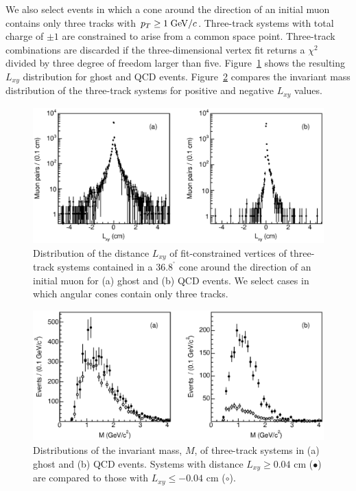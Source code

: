 \documentclass[aps,prd,preprint,floatfix,nofootinbib,superscriptaddress,showpacs,amssymb]{revtex4}
\def\deg{^\circ}
\begin{document}
 We also select events in which a cone around the direction of an initial
 muon contains only three tracks with $p_T \geq 1 \; {\rm GeV/}c$. Three-track
 systems with total charge of $\pm 1$ are constrained to arise from a
 common space point. Three-track combinations are discarded if the
 three-dimensional vertex fit returns a $\chi^2$ divided by three degree
 of freedom larger than five. Figure~\ref{fig:fig_37} shows the resulting $L_{xy}$
 distribution for ghost and QCD events. Figure~\ref{fig:fig_38} compares
 the invariant mass distribution  of the three-track systems for positive and negative
 $L_{xy}$ values.
 \begin{figure}
 \begin{center}
 \vspace{-0.3in}
 \leavevmode
 \includegraphics*[width=\textwidth]{fa0_37.eps}
 \caption[]{Distribution of the distance  $L_{xy}$ of fit-constrained vertices
            of three-track systems contained in a $36.8^{\deg}$ cone around  
            the direction of an initial muon for (a) ghost and (b) QCD events.
            We select cases in which angular cones contain only three tracks.}
 \label{fig:fig_37}
 \end{center}
 \end{figure}
 \begin{figure}
 \begin{center}
 \vspace{-0.3in}
 \leavevmode
 \includegraphics*[width=\textwidth]{fa0_38.eps}
 \caption[]{Distributions of the invariant mass, $M$, of three-track systems
            in (a) ghost and (b) QCD events. Systems with distance 
            $L_{xy} \geq 0.04$ cm ($\bullet$) are compared to those with 
            $L_{xy} \leq -0.04$ cm ($\circ$).}
 \label{fig:fig_38}
 \end{center}
 \end{figure}
 
 
\end{document}
